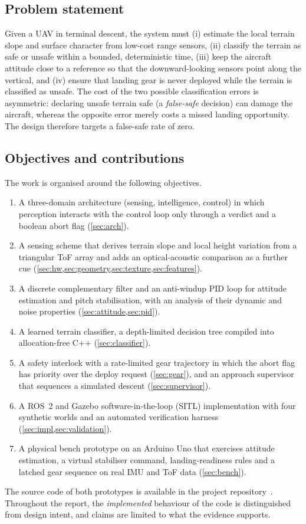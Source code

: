 \documentclass[11pt,a4paper]{article}
\begin{document}
\subsection{Problem statement}
Given a UAV in terminal descent, the system must (i) estimate the local terrain slope and surface character from low-cost range sensors, (ii) classify the terrain as safe or unsafe within a bounded, deterministic time, (iii) keep the aircraft attitude close to a reference so that the downward-looking sensors point along the vertical, and (iv) ensure that landing gear is never deployed while the terrain is classified as unsafe. The cost of the two possible classification errors is asymmetric: declaring unsafe terrain safe (a \emph{false-safe} decision) can damage the aircraft, whereas the opposite error merely costs a missed landing opportunity. The design therefore targets a false-safe rate of zero.
 
\subsection{Objectives and contributions}
The work is organised around the following objectives.
\begin{enumerate}
  \item A three-domain architecture (sensing, intelligence, control) in which perception interacts with the control loop only through a verdict and a boolean abort flag (\cref{sec:arch}).
  \item A sensing scheme that derives terrain slope and local height variation from a triangular ToF array and adds an optical-acoustic comparison as a further cue (\cref{sec:hw,sec:geometry,sec:texture,sec:features}).
  \item A discrete complementary filter and an anti-windup PID loop for attitude estimation and pitch stabilisation, with an analysis of their dynamic and noise properties (\cref{sec:attitude,sec:pid}).
  \item A learned terrain classifier, a depth-limited decision tree compiled into allocation-free C++ (\cref{sec:classifier}).
  \item A safety interlock with a rate-limited gear trajectory in which the abort flag has priority over the deploy request (\cref{sec:gear}), and an approach supervisor that sequences a simulated descent (\cref{sec:supervisor}).
  \item A ROS~2 and Gazebo software-in-the-loop (SITL) implementation with four synthetic worlds and an automated verification harness (\cref{sec:impl,sec:validation}).
  \item A physical bench prototype on an Arduino Uno that exercises attitude estimation, a virtual stabiliser command, landing-readiness rules and a latched gear sequence on real IMU and ToF data (\cref{sec:bench}).
\end{enumerate}
The source code of both prototypes is available in the project repository~\cite{repo}. Throughout the report, the \emph{implemented} behaviour of the code is distinguished from design intent, and claims are limited to what the evidence supports.
 
\end{document}
